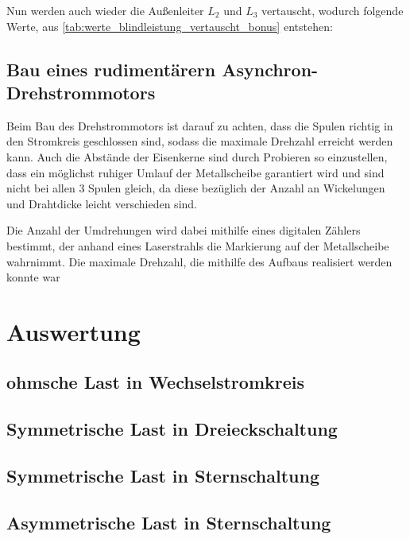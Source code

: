 \documentclass[12pt,english,ngerman]{scrartcl}
\begin{document}
Nun werden auch wieder die Außenleiter $L_2$ und $L_3$ vertauscht, wodurch folgende Werte, aus \autoref{tab:werte_blindleistung_vertauscht_bonus} entstehen:



\subsection{Bau eines rudimentärern Asynchron-Drehstrommotors}

Beim Bau des Drehstrommotors ist darauf zu achten, dass die Spulen richtig in den Stromkreis geschlossen sind, sodass die 
maximale Drehzahl erreicht werden kann. Auch die Abstände der Eisenkerne sind durch Probieren so einzustellen, dass ein möglichst
ruhiger Umlauf der Metallscheibe garantiert wird und sind nicht bei allen 3 Spulen gleich, da diese bezüglich der Anzahl
an Wickelungen und Drahtdicke leicht verschieden sind.

Die Anzahl der Umdrehungen wird dabei mithilfe eines digitalen Zählers bestimmt, der anhand eines Laserstrahls die Markierung
auf der Metallscheibe wahrnimmt.
Die maximale Drehzahl, die mithilfe des Aufbaus realisiert werden konnte war 



\section{Auswertung}
\label{sec:auswertung}

\subsection{ohmsche Last in Wechselstromkreis}


\subsection{Symmetrische Last in Dreieckschaltung}


\subsection{Symmetrische Last in Sternschaltung}


\subsection{Asymmetrische Last in Sternschaltung}
\end{document}

